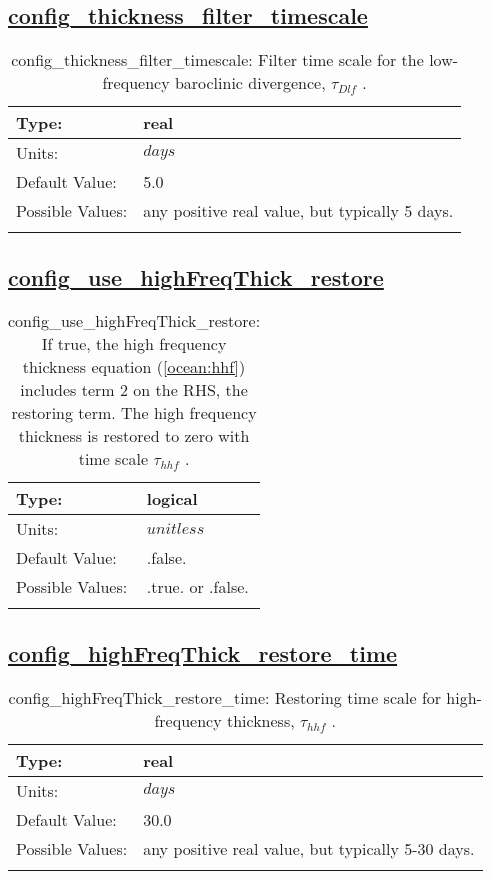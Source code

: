 \subsection[config\_thickness\_filter\_timescale]{\hyperref[sec:nm_tab_ALE_frequency_filtered_thickness]{config\_thickness\_filter\_timescale}}
\label{subsec:nm_sec_config_thickness_filter_timescale}
\begin{center}
\begin{longtable}{| p{2.0in} | p{4.0in} |}
    \hline
    Type: & real \\
    \hline
    Units: & $days$ \\
    \hline
    Default Value: & 5.0 \\
    \hline
    Possible Values: & any positive real value, but typically 5 days. \\
    \hline
    \caption{config\_thickness\_filter\_timescale:  Filter time scale for the low-frequency baroclinic divergence,  $\tau_{Dlf}$ .}
\end{longtable}
\end{center}
\subsection[config\_use\_highFreqThick\_restore]{\hyperref[sec:nm_tab_ALE_frequency_filtered_thickness]{config\_use\_highFreqThick\_restore}}
\label{subsec:nm_sec_config_use_highFreqThick_restore}
\begin{center}
\begin{longtable}{| p{2.0in} | p{4.0in} |}
    \hline
    Type: & logical \\
    \hline
    Units: & $unitless$ \\
    \hline
    Default Value: & .false. \\
    \hline
    Possible Values: & .true. or .false. \\
    \hline
    \caption{config\_use\_highFreqThick\_restore:  If true, the high frequency thickness equation (\ref{ocean:hhf}) includes term 2 on the RHS, the restoring term.  The high frequency thickness is restored to zero with time scale  $\tau_{hhf}$ .}
\end{longtable}
\end{center}
\subsection[config\_highFreqThick\_restore\_time]{\hyperref[sec:nm_tab_ALE_frequency_filtered_thickness]{config\_highFreqThick\_restore\_time}}
\label{subsec:nm_sec_config_highFreqThick_restore_time}
\begin{center}
\begin{longtable}{| p{2.0in} | p{4.0in} |}
    \hline
    Type: & real \\
    \hline
    Units: & $days$ \\
    \hline
    Default Value: & 30.0 \\
    \hline
    Possible Values: & any positive real value, but typically 5-30 days. \\
    \hline
    \caption{config\_highFreqThick\_restore\_time:  Restoring time scale for high-frequency thickness,  $\tau_{hhf}$ .}
\end{longtable}
\end{center}
